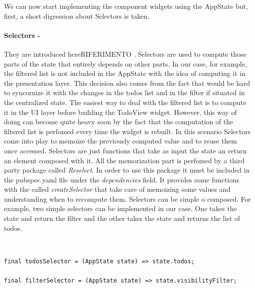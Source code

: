 We can now start implementing the component widgets using the AppState but, first, a short digression about Selectors is taken.
\paragraph{Selectors - }
\label{subpar:todo_app_bloc_core_state}
They are introduced hereRIFERIMENTO . Selectors are used to compute those parts of the state that entirely depends on other parts. In our case, for example, the filtered list is not included in the AppState with the idea of computing it in the presentation layer. This decision also comes from the fact that would be hard to syncornize it with the changes in the todos list and in the filter if situated in the centralized state. The easiest way to deal with the filtered list is to compute it in the UI layer before building the TodoView widget. However, this way of doing can become quite heavy soon by the fact that the computation of the filtered list is perfomed every time the widget is rebuilt. In this scenario Selectors come into play to memoize the previously computed value and to reuse them once accessed. Selectors are just functions that take as input the state an return an element composed with it. All the memorization part is perfomed by a third party package called \textit{Reselect}. In order to use this package it must be included in the pubspec.yaml file under the \textit{dependencies} field. It provides some functions with the called \textit{createSelector} that take care of memoizing some values and understanding when to recompute them. Selectors can be simple o composed. For example, two simple selectors can be implemented in our case. One  takes the state and return the filter and the other takes the state and returns the list of todos.
\begin{code}
\mbox{}\\
 \mbox{}
		\label{code:2.14}
\begin{verbatim}
final todosSelector = (AppState state) => state.todos;

final filterSelector = (AppState state) => state.visibilityFilter;
\end{verbatim}
\mbox{}
\end{code}

